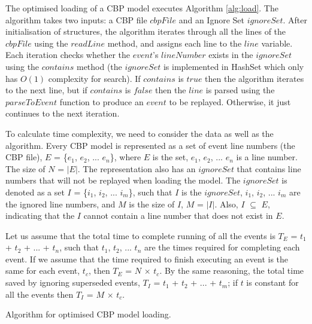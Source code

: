 \documentclass{llncs}
\begin{document}
    The optimised loading of a CBP model executes Algorithm \ref{alg:load}.  The algorithm takes two inputs: a CBP file $cbpFile$ and an Ignore Set $ignoreSet$. After initialisation of structures, the algorithm iterates through all the lines of the $cbpFile$ using the $readLine$ method, and assigns each line to the $line$ variable. Each iteration checks whether the $event$'s $lineNumber$ exists in the $ignoreSet$ using the $contains$ method (the $ignoreSet$ is implemented in HashSet which only has $O(1)$ complexity for search).  If $contains$ is  $true$ then the algorithm iterates to the next line, but if $contains$ is  $false$ then the $line$ is parsed using the $parseToEvent$ function to produce an $event$ to be replayed. Otherwise, it just continues to the next iteration. 
      
    To calculate time complexity, we need to consider the data as well as the algorithm.  Every CBP model is represented as a set of event line numbers (the CBP file), $E$ = \{$e_1$, $e_2$, ... $e_n$\}, where $E$ is the set, $e_1$, $e_2$, ... $e_n$ is a line number.  The size of $N$ = $|E|$. The representation also has an $ignoreSet$ that contains line numbers that will not be replayed when loading the model. The $ignoreSet$ is denoted as a set $I$  = \{$i_1$, $i_2$, ... $i_m$\}, such that $I$ is the $ignoreSet$, $i_1$, $i_2$, ... $i_m$ are the ignored line numbers, and $M$ is the size of $I$, $M$ = $|I|$. Also, $I$ $\subseteq$ $E$, indicating that the $I$ cannot contain a line number that does not exist in $E$.
    
    Let us assume that the total time to complete running of all the events is $T_E$ = $t_1$ + $t_2$ + ... + $t_n$, such that $t_1$, $t_2$, ... $t_n$ are the times required for completing each event. If we assume that the time required to finish executing an event is the same for each event, $t_c$, then $T_E$ = $N$ $\times$ $t_c$.  By the same reasoning, the total time saved by ignoring superseded events,  $T_I$ = $t_1$ + $t_2$ + ... + $t_m$; if $t$ is constant for all the events then $T_I$ = $M$ $\times$ $t_c$.
    
    \IncMargin{1.5em}
    \begin{algorithm}[H]
\begin{small}
\end{small}
\caption{Algorithm for optimised CBP model loading.}
\label{alg:load}
    \end{algorithm}
    \DecMargin{1.5em}
\end{document}
